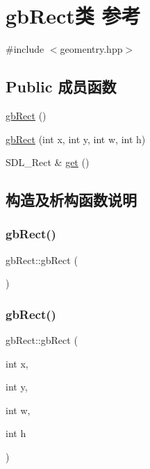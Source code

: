 \hypertarget{classgb_rect}{}\section{gb\+Rect类 参考}
\label{classgb_rect}


{\ttfamily \#include $<$geomentry.\+hpp$>$}

\subsection*{Public 成员函数}
\begin{DoxyCompactItemize}
\item 
\mbox{\hyperlink{classgb_rect_a92bc23d7f814473c95c10e55b5b36887}{gb\+Rect}} ()
\item 
\mbox{\hyperlink{classgb_rect_ad87d8d116e21198f08bdcffdbbe6361f}{gb\+Rect}} (int x, int y, int w, int h)
\item 
S\+D\+L\+\_\+\+Rect \& \mbox{\hyperlink{classgb_rect_acffe4a05edb23c1e9169db77599de202}{get}} ()
\end{DoxyCompactItemize}


\subsection{构造及析构函数说明}
\mbox{\label{classgb_rect_a92bc23d7f814473c95c10e55b5b36887}} 
\subsubsection{\texorpdfstring{gbRect()}{gbRect()}\hspace{0.1cm}{\footnotesize\ttfamily [1/2]}}
{\footnotesize\ttfamily gb\+Rect\+::gb\+Rect (\begin{DoxyParamCaption}{ }\end{DoxyParamCaption})}

\mbox{\label{classgb_rect_ad87d8d116e21198f08bdcffdbbe6361f}} 
\subsubsection{\texorpdfstring{gbRect()}{gbRect()}\hspace{0.1cm}{\footnotesize\ttfamily [2/2]}}
{\footnotesize\ttfamily gb\+Rect\+::gb\+Rect (\begin{DoxyParamCaption}\item[{int}]{x,  }\item[{int}]{y,  }\item[{int}]{w,  }\item[{int}]{h }\end{DoxyParamCaption})}



